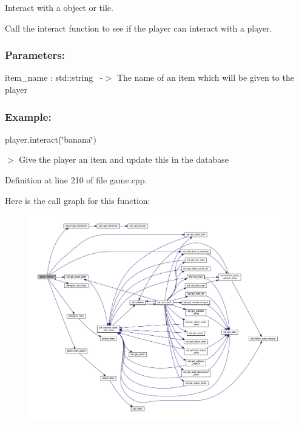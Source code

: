 Interact with a object or tile. 

Call the \textquotesingle{}interact\textquotesingle{} function to see if the player can interact with a player.~\newline


\subsubsection*{Parameters\+: }

item\+\_\+name \+: std\+::string~\newline
-\/$>$ The name of an item which will be given to the player

\subsubsection*{Example\+: }

player.\+interact(\char`\"{}banana\char`\"{}) ~\newline

\begin{DoxyItemize}
\item $>$ Give the player an item and update this in the database 
\end{DoxyItemize}

Definition at line 210 of file game.\+cpp.

Here is the call graph for this function\+:
\nopagebreak
\begin{figure}[H]
\begin{center}
\leavevmode
\includegraphics[width=350pt]{classgame_aa78cf955c292ac2bd75fa385a946cd6e_cgraph}
\end{center}
\end{figure}
\mbox{\label{classgame_a3718980f99cd44e9c882c2aa67368450}} 
